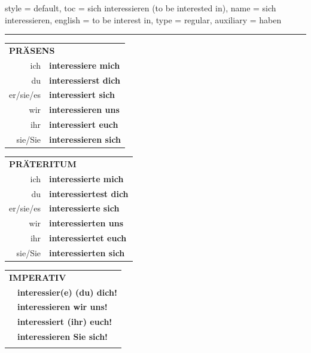 \begin{verbentry}{
  style = {default},
  toc = {sich interessieren (to be interested in)},
  name = {sich interessieren},
  english = {to be interest in},
  type = {regular},
  auxiliary = {haben}
}
 
    
     \vspace{5pt}

    \hrule
    
    \vspace{5pt}

  \begin{tabular}{rl}
     \multicolumn{2}{l}{\textbf{PRÄSENS} }\\
    ich & \textbf{interessiere mich}\\
    du & \textbf{interessierst dich}\\
    er/sie/es & \textbf{interessiert sich}\\
    wir & \textbf{interessieren uns}\\
    ihr & \textbf{interessiert euch}\\
    sie/Sie & \textbf{interessieren sich}\\
  \end{tabular}
  \hfill
     \begin{tabular}{rl}
    \multicolumn{2}{l}{\textbf{PRÄTERITUM} }\\
    ich & \textbf{interessierte mich}\\
    du & \textbf{interessiertest dich}\\
    er/sie/es & \textbf{interessierte sich}\\
    wir & \textbf{interessierten uns}\\
    ihr & \textbf{interessiertet euch}\\
    sie/Sie & \textbf{interessierten sich}\\
  \end{tabular}
  \hfill
  \begin{tabular}{rl}
     \multicolumn{2}{l}{\textbf{IMPERATIV} }\\
   & \textbf{interessier(e) (du) dich!}\\
   & \textbf{interessieren wir uns!}\\
   & \textbf{interessiert (ihr) euch!}\\
   & \textbf{interessieren Sie sich!}\\
   & \vspace{10pt}
  \end{tabular}


\end{verbentry}
